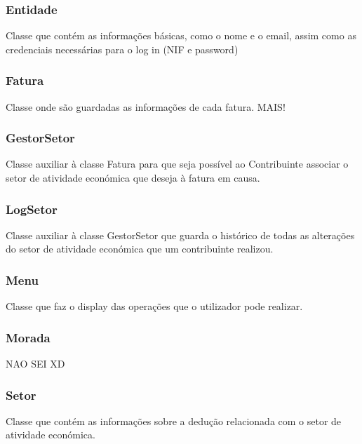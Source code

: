 \documentclass[a4paper]{article}
\begin{document}
\subsubsection{Entidade} %

Classe que contém as informações básicas, como o nome e o email, assim como as credenciais necessárias para o log in (NIF e password)


\subsubsection{Fatura} %

Classe onde são guardadas as informações de cada fatura. MAIS!


\subsubsection{GestorSetor} %

Classe auxiliar à classe Fatura para que seja possível ao Contribuinte associar o setor de atividade económica que deseja à fatura em causa. 


\subsubsection{LogSetor} %

Classe auxiliar à classe GestorSetor que guarda o histórico de todas as alterações do setor de atividade económica que um contribuinte realizou.

 
\subsubsection{Menu} %

Classe que faz o display das operações que o utilizador pode realizar.


\subsubsection{Morada} %

NAO SEI XD


\subsubsection{Setor} %

Classe que contém as informações sobre a dedução relacionada com o setor de atividade económica.
\end{document}
